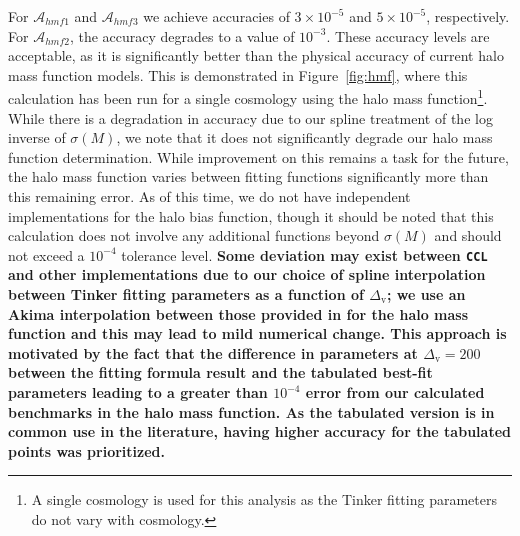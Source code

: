 \documentclass[\docopts]{\docclass}
\newcommand{\ccl}{{\tt CCL}\xspace}
\begin{document}
For $\mathcal{A}_{hmf1}$ and $\mathcal{A}_{hmf3}$ we achieve accuracies of $3\times 10^{-5}$ and $5 \times 10^{-5}$, respectively. For $\mathcal{A}_{hmf2}$, the accuracy degrades to a value of $10^{-3}$. These accuracy levels are acceptable, as it is significantly better than the physical accuracy of current halo mass function models. This is demonstrated in Figure~\ref{fig:hmf}, where this calculation has been run for a single cosmology using the \citet{Tinker2010} halo mass function\footnote{A single cosmology is used for this analysis as the Tinker fitting parameters do not vary with cosmology.}. While there is a degradation in accuracy due to our spline treatment of the log inverse of $\sigma(M)$, we note that it does not significantly degrade our halo mass function determination. While improvement on this remains a task for the future, the halo mass function varies between fitting functions significantly more than this remaining error. As of this time, we do not have independent implementations for the halo bias function, though it should be noted that this calculation does not involve any additional functions beyond $\sigma(M)$ and should not exceed a $10^{-4}$ tolerance level. {\bf Some deviation may exist between \ccl and other implementations due to our choice of spline interpolation between Tinker fitting parameters as a function of $\Delta_\mathrm{v}$; we use an Akima interpolation between those provided in \citet{Tinker2010} for the halo mass function and this may lead to mild numerical change. This approach is motivated by the fact that the difference in parameters at $\Delta_\mathrm{v} = 200$ between the fitting formula result and the tabulated best-fit parameters leading to a greater than $10^{-4}$ error from our calculated benchmarks in the halo mass function. As the tabulated version is in common use in the literature, having higher accuracy for the tabulated points was prioritized.}
\end{document}
